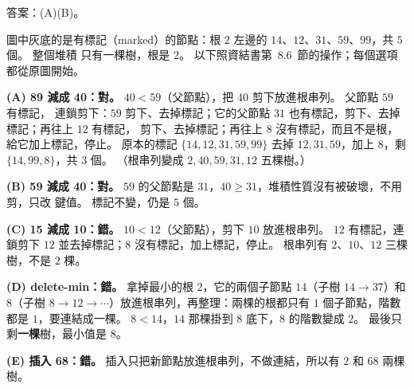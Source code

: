 \begin{pastsoln}
答案：(A)(B)。

圖中灰底的是有標記（marked）的節點：根 $2$ 左邊的 $14$、$12$、$31$、$59$、$99$，共 $5$ 個。 整個堆積
只有一棵樹，根是 $2$。 以下照資結書第~8.6~節的操作；每個選項都從原圖開始。

\textbf{(A) 89 減成 40：對。} $40 < 59$（父節點），把 $40$ 剪下放進根串列。 父節點 $59$ 有標記，
連鎖剪下：$59$ 剪下、去掉標記；它的父節點 $31$ 也有標記，剪下、去掉標記；再往上 $12$ 有標記，
剪下、去掉標記；再往上 $8$ 沒有標記，而且不是根，給它加上標記，停止。 原本的標記
$\{14, 12, 31, 59, 99\}$ 去掉 $12, 31, 59$，加上 $8$，剩 $\{14, 99, 8\}$，共 $3$ 個。 （根串列變成
$2, 40, 59, 31, 12$ 五棵樹。）

\textbf{(B) 59 減成 40：對。} $59$ 的父節點是 $31$，$40 \ge 31$，堆積性質沒有被破壞，不用剪，只改
鍵值。 標記不變，仍是 $5$ 個。

\textbf{(C) 15 減成 10：錯。} $10 < 12$（父節點），剪下 $10$ 放進根串列。 $12$ 有標記，連鎖剪下 $12$
並去掉標記；$8$ 沒有標記，加上標記，停止。 根串列有 $2$、$10$、$12$ 三棵樹，不是 $2$ 棵。

\textbf{(D) delete-min：錯。} 拿掉最小的根 $2$，它的兩個子節點 $14$（子樹 $14 \to 37$）和 $8$（子樹
$8 \to 12 \to \cdots$）放進根串列，再整理：兩棵的根都只有 $1$ 個子節點，階數都是 $1$，要連結成一棵。
$8 < 14$，$14$ 那棵掛到 $8$ 底下，$8$ 的階數變成 $2$。 最後只剩\textbf{一棵}樹，最小值是 $8$。

\textbf{(E) 插入 68：錯。} 插入只把新節點放進根串列，不做連結，所以有 $2$ 和 $68$ 兩棵樹。
\end{pastsoln}
